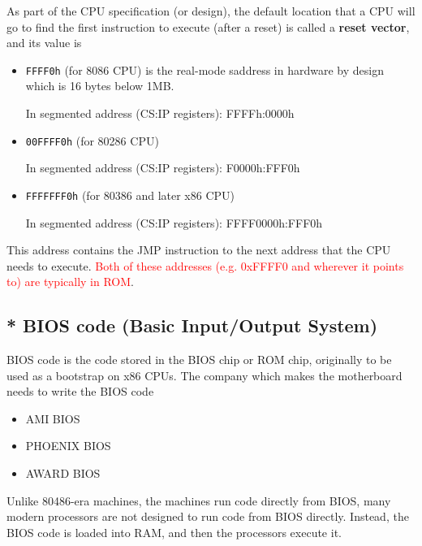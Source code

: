 \begin{mdframed}
As part of the CPU specification (or design), the default location that a CPU
will go to find the first instruction to execute (after a reset) is called a
{\bf reset vector}, and its value is 
\begin{itemize}
  \item \verb!FFFF0h! (for 8086 CPU) is the real-mode saddress in hardware by
  design which is 16 bytes below 1MB.
  
  In segmented address (CS:IP registers): FFFFh:0000h
  
  \item \verb!00FFFF0h! (for 80286 CPU)
  
  In segmented address (CS:IP registers): F0000h:FFF0h
  
  \item \verb!FFFFFFF0h! (for 80386 and later x86 CPU)
  
  In segmented address (CS:IP registers): FFFF0000h:FFF0h
  
\end{itemize}
This address contains the JMP instruction to the next address that the CPU
needs to execute. \textcolor{red}{Both of these addresses (e.g. 0xFFFF0 and
wherever it points to) are typically in ROM}.

\end{mdframed}


\subsection{* BIOS code (Basic Input/Output System)}
\label{sec:BIOS-code}

BIOS code is the code stored in the BIOS chip or ROM chip, originally to be
used as a bootstrap on x86 CPUs. The company which makes the motherboard needs
to write the BIOS code
\begin{itemize}
  \item AMI BIOS
  \item PHOENIX BIOS
  \item AWARD BIOS
\end{itemize}

\begin{mdframed}

Unlike 80486-era machines, the machines run code directly from BIOS, many modern
processors are not designed to run code from BIOS directly. Instead, the BIOS
code is loaded into RAM, and then the processors execute it.
\end{mdframed}

